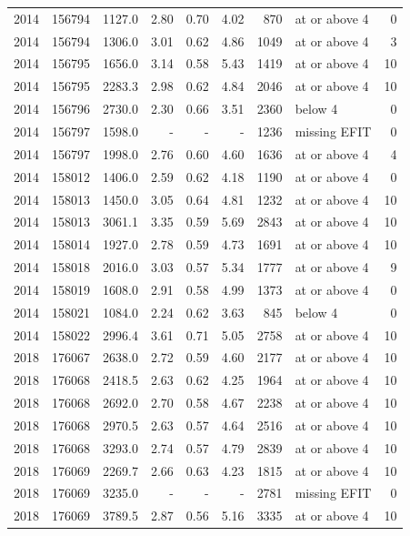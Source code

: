 \begin{longtable}{@{}rrrrrrrlr@{}}
2014 & 156794 & 1127.0 & 2.80 & 0.70 & 4.02 & 870 & at or above 4 & 0 \\
2014 & 156794 & 1306.0 & 3.01 & 0.62 & 4.86 & 1049 & at or above 4 & 3 \\
2014 & 156795 & 1656.0 & 3.14 & 0.58 & 5.43 & 1419 & at or above 4 & 10 \\
2014 & 156795 & 2283.3 & 2.98 & 0.62 & 4.84 & 2046 & at or above 4 & 10 \\
2014 & 156796 & 2730.0 & 2.30 & 0.66 & 3.51 & 2360 & below 4 & 0 \\
2014 & 156797 & 1598.0 & - & - & - & 1236 & missing EFIT & 0 \\
2014 & 156797 & 1998.0 & 2.76 & 0.60 & 4.60 & 1636 & at or above 4 & 4 \\
2014 & 158012 & 1406.0 & 2.59 & 0.62 & 4.18 & 1190 & at or above 4 & 0 \\
2014 & 158013 & 1450.0 & 3.05 & 0.64 & 4.81 & 1232 & at or above 4 & 10 \\
2014 & 158013 & 3061.1 & 3.35 & 0.59 & 5.69 & 2843 & at or above 4 & 10 \\
2014 & 158014 & 1927.0 & 2.78 & 0.59 & 4.73 & 1691 & at or above 4 & 10 \\
2014 & 158018 & 2016.0 & 3.03 & 0.57 & 5.34 & 1777 & at or above 4 & 9 \\
2014 & 158019 & 1608.0 & 2.91 & 0.58 & 4.99 & 1373 & at or above 4 & 0 \\
2014 & 158021 & 1084.0 & 2.24 & 0.62 & 3.63 & 845 & below 4 & 0 \\
2014 & 158022 & 2996.4 & 3.61 & 0.71 & 5.05 & 2758 & at or above 4 & 10 \\
2018 & 176067 & 2638.0 & 2.72 & 0.59 & 4.60 & 2177 & at or above 4 & 10 \\
2018 & 176068 & 2418.5 & 2.63 & 0.62 & 4.25 & 1964 & at or above 4 & 10 \\
2018 & 176068 & 2692.0 & 2.70 & 0.58 & 4.67 & 2238 & at or above 4 & 10 \\
2018 & 176068 & 2970.5 & 2.63 & 0.57 & 4.64 & 2516 & at or above 4 & 10 \\
2018 & 176068 & 3293.0 & 2.74 & 0.57 & 4.79 & 2839 & at or above 4 & 10 \\
2018 & 176069 & 2269.7 & 2.66 & 0.63 & 4.23 & 1815 & at or above 4 & 10 \\
2018 & 176069 & 3235.0 & - & - & - & 2781 & missing EFIT & 0 \\
2018 & 176069 & 3789.5 & 2.87 & 0.56 & 5.16 & 3335 & at or above 4 & 10 \\

\end{longtable}
